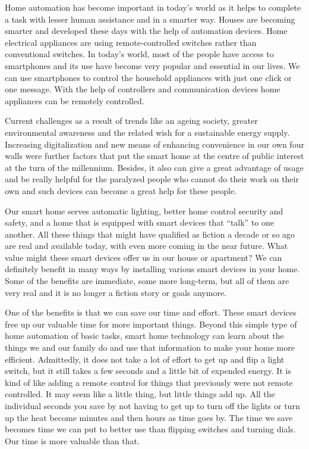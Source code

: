 Home automation has become important in today’s world as it helps to complete a task with lesser human assistance and in a smarter way. Houses are becoming smarter and developed these days with the help of automation devices. Home electrical appliances are using remote-controlled switches rather than conventional switches. In today’s world, most of the people have access to smartphones and its use have become very popular and essential in our lives. We can use smartphones to control the household appliances with just one click or one message. With the help of controllers and communication devices home appliances can be remotely controlled.

Current challenges as a result of trends like an ageing society, greater environmental awareness and the related wish for a sustainable energy supply. Increasing digitalization and new means of enhancing convenience in our own four walls were further factors that put the smart home at the centre of public interest at the turn of the millennium. Besides, it also can give a great advantage of usage and be really helpful for the paralyzed people who cannot do their work on their own and such devices can become a great help for these people.

Our smart home serves automatic lighting, better home control security and safety, and a home that is equipped with smart devices that “talk” to one another. All these things that might have qualified as fiction a decade or so ago are real and available today, with even more coming in the near future. What value might these smart devices offer us in our house or apartment? We can definitely benefit in many ways by installing various smart devices in your home. Some of the benefits are immediate, some more long-term, but all of them are very real and it is no longer a fiction story or goals anymore.

One of the benefits is that we can save our time and effort. These smart devices free up our valuable time for more important things. Beyond this simple type of home automation of basic tasks, smart home technology can learn about the things we and our family do and use that information to make your home more efficient. Admittedly, it does not take a lot of effort to get up and flip a light switch, but it still takes a few seconds and a little bit of expended energy. It is kind of like adding a remote control for things that previously were not remote controlled. It may seem like a little thing, but little things add up. All the individual seconds you save by not having to get up to turn off the lights or turn up the heat become minutes and then hours as time goes by. The time we save becomes time we can put to better use than flipping switches and turning dials. Our time is more valuable than that.

